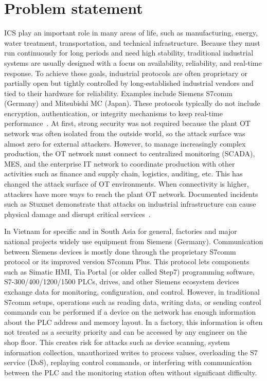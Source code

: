 \documentclass[../main.tex]{subfiles}
\begin{document}
\section{Problem statement}
\label{sec:dvd}

ICS play an important role in many areas of life, such as manufacturing, energy, water treatment, transportation, and technical infrastructure. Because they must run continuously for long periods and need high stability, traditional industrial systems are usually designed with a focus on availability, reliability, and real-time response. To achieve these goals, industrial protocols are often proprietary or partially open but tightly controlled by long-established industrial vendors and tied to their hardware for reliability. Examples include Siemens S7comm (Germany) and Mitsubishi MC (Japan). These protocols typically do not include encryption, authentication, or integrity mechanisms to keep real-time performance~\cite{inprotech_s7comm_security,nist_sp800_82}. At first, strong security was not required because the plant OT network was often isolated from the outside world, so the attack surface was almost zero for external attackers. However, to manage increasingly complex production, the OT network must connect to centralized monitoring (SCADA), MES, and the enterprise IT network to coordinate production with other activities such as finance and supply chain, logistics, auditing, etc. This has changed the attack surface of OT environments. When connectivity is higher, attackers have more ways to reach the plant OT network. Documented incidents such as Stuxnet demonstrate that attacks on industrial infrastructure can cause physical damage and disrupt critical services~\cite{falliere2010stuxnet,langner2011stuxnet}.

In Vietnam for specific and in South Asia for general, factories and major national projects widely use equipment from Siemens (Germany). Communication between Siemens devices is mostly done through the proprietary S7comm protocol or its improved version S7comm Plus. This protocol lets components such as Simatic HMI, Tia Portal (or older called Step7) programming software, S7-300/400/1200/1500 PLCs, drives, and other Siemens ecosystem devices exchange data for monitoring, configuration, and control. However, in traditional S7comm setups, operations such as reading data, writing data, or sending control commands can be performed if a device on the network has enough information about the PLC address and memory layout. In a factory, this information is often not treated as a security priority and can be accessed by any engineer on the shop floor. This creates risk for attacks such as device scanning, system information collection, unauthorized writes to process values, overloading the S7 service (DoS), replaying control commands, or interfering with communication between the PLC and the monitoring station often without significant difficulty.
\end{document}
